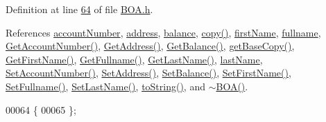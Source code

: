 Definition at line \hyperlink{_b_o_a_8h_source_l00064}{64} of file \hyperlink{_b_o_a_8h_source}{B\+O\+A.\+h}.



References \hyperlink{_b_o_a_8h_source_l00098}{account\+Number}, \hyperlink{_b_o_a_8h_source_l00100}{address}, \hyperlink{_b_o_a_8h_source_l00099}{balance}, \hyperlink{_b_o_a_8cpp_source_l00034}{copy()}, \hyperlink{_b_o_a_8h_source_l00096}{first\+Name}, \hyperlink{_b_o_a_8h_source_l00095}{fullname}, \hyperlink{_b_o_a_8cpp_source_l00074}{Get\+Account\+Number()}, \hyperlink{_b_o_a_8cpp_source_l00058}{Get\+Address()}, \hyperlink{_b_o_a_8cpp_source_l00066}{Get\+Balance()}, \hyperlink{_b_o_a_8cpp_source_l00022}{get\+Base\+Copy()}, \hyperlink{_b_o_a_8cpp_source_l00090}{Get\+First\+Name()}, \hyperlink{_b_o_a_8cpp_source_l00098}{Get\+Fullname()}, \hyperlink{_b_o_a_8cpp_source_l00082}{Get\+Last\+Name()}, \hyperlink{_b_o_a_8h_source_l00097}{last\+Name}, \hyperlink{_b_o_a_8cpp_source_l00070}{Set\+Account\+Number()}, \hyperlink{_b_o_a_8cpp_source_l00054}{Set\+Address()}, \hyperlink{_b_o_a_8cpp_source_l00062}{Set\+Balance()}, \hyperlink{_b_o_a_8cpp_source_l00086}{Set\+First\+Name()}, \hyperlink{_b_o_a_8cpp_source_l00094}{Set\+Fullname()}, \hyperlink{_b_o_a_8cpp_source_l00078}{Set\+Last\+Name()}, \hyperlink{_b_o_a_8cpp_source_l00048}{to\+String()}, and \hyperlink{_b_o_a_8cpp_source_l00015}{$\sim$\+B\+O\+A()}.


\begin{DoxyCode}
00064                                    \{
00065     \};
\end{DoxyCode}


